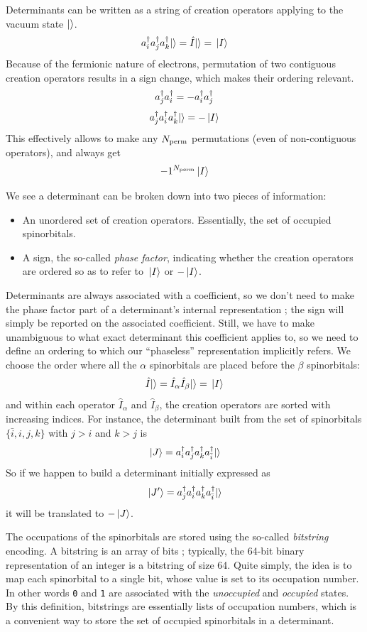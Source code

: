 \documentclass[./thesis.tex]{subfiles}
\begin{document}
Determinants can be written as a string of creation operators applying to the vacuum state ${\ket{}}$.
$$a^\dagger_{i} a^\dagger_{j} a^\dagger_{k} {\ket{}} = \hat{I} {\ket{}} = {\ket*{I}}$$
Because of the fermionic nature of electrons, permutation of two contiguous creation operators results in a sign change, which makes their ordering relevant.
$$a^\dagger_{j} a^\dagger_{i} = -a^\dagger_{i} a^\dagger_{j}$$
$$a^\dagger_{j} a^\dagger_{i} a^\dagger_{k} {\ket{}} = -{\ket*{I}}$$
This effectively allows to make any ${N_\text{perm}}$ permutations (even of non-contiguous operators), and always get
$$-1^{{N_\text{perm}}} {\ket*{I}}$$


We see a determinant can be broken down into two pieces of information:
\begin{itemize}
\item
An unordered set of creation operators. Essentially, the set of occupied spinorbitals.
\item
A sign, the so-called \emph{phase factor}, indicating whether the creation operators are ordered so as to refer to ${\ket*{I}}$ or $-{\ket*{I}}$.
\end{itemize}

Determinants are always associated with a coefficient, so we don't need to make the phase factor part of a determinant's internal representation ; the sign will simply be reported on the associated coefficient. Still, we have to make unambiguous to what exact determinant this coefficient applies to, so we need to define an ordering to which our ``phaseless'' representation implicitly refers. We choose the order where all the $\alpha$ spinorbitals are placed before the $\beta$ spinorbitals:
\begin{equation}
\label{eq:spinpack}
\hat{I} {\ket{}} = \hat{I}_\alpha \hat{I}_\beta {\ket{}} = {\ket*{I}}
\end{equation}
and within each operator $\hat{I}_\alpha$ and $\hat{I}_\beta$, the creation operators are sorted with
increasing indices.
For instance, the determinant built from the set of spinorbitals $\{\bar i, i,j,k \}$ with $j>i$ and $k>j$ is
$${\ket*{J}} = a^\dagger_{i} a^\dagger_{j} a^\dagger_{k} a^\dagger_{\bar i} {\ket{}} $$
So if we happen to build a determinant initially expressed as
$${\ket*{J'}} = a^\dagger_{j} a^\dagger_{i} a^\dagger_{k} a^\dagger_{\bar i} {\ket{}} $$
it will be translated to $-{\ket*{J}}$.


The occupations of the spinorbitals are stored using the so-called \emph{bitstring} encoding. A bitstring is an array of bits ; typically, the 64-bit binary representation of an integer is a bitstring of size 64.
Quite simply, the idea is to map each spinorbital to a single bit, whose value is set to its occupation number. In other words \texttt{0} and \texttt{1} are associated with the \emph{unoccupied} and \emph{occupied} states.
By this definition, bitstrings are essentially lists of occupation numbers, which is a convenient way to
store the set of occupied spinorbitals in a determinant.
\end{document}

